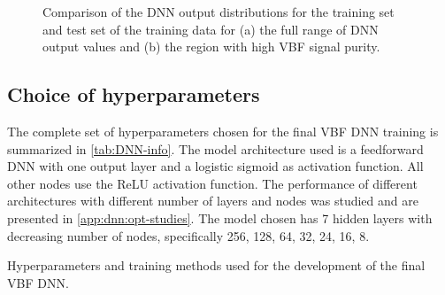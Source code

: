 \begin{figure}[t]
    \caption{Comparison of the DNN output distributions for the training set and test set of the training data for (a) the full range of DNN output values and (b) the region with high VBF signal purity.}
    \label{fig:dnn-train-vs-test}
\end{figure}


\subsection{Choice of hyperparameters}
\label{subsec:hyper-parameters}
The complete set of hyperparameters chosen for the final VBF DNN training is summarized in \cref{tab:DNN-info}. The model architecture used is a feedforward DNN with one output layer and a logistic sigmoid as activation function. All other nodes use the ReLU activation function.
The performance of different architectures with different number of layers and nodes was studied and are presented in \cref{app:dnn:opt-studies}.
The model chosen has 7 hidden layers with decreasing number of nodes, specifically {256, 128, 64, 32, 24, 16, 8}.

\begin{table}[t]
    \begin{center}
        
    \end{center}
    \caption{Hyperparameters and training methods used for the development of the final VBF DNN.
    }
    \label{tab:DNN-info}
\end{table}

